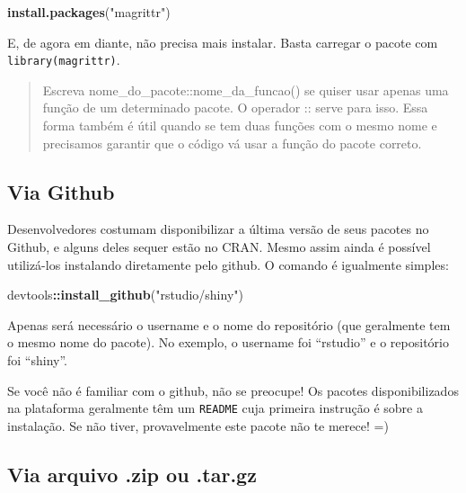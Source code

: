 \documentclass[
]{book}
\newenvironment{Shaded}{\begin{snugshade}}{\end{snugshade}}
\newcommand{\KeywordTok}[1]{\textcolor[rgb]{0.13,0.29,0.53}{\textbf{#1}}}
\newcommand{\NormalTok}[1]{#1}
\newcommand{\OperatorTok}[1]{\textcolor[rgb]{0.81,0.36,0.00}{\textbf{#1}}}
\newcommand{\StringTok}[1]{\textcolor[rgb]{0.31,0.60,0.02}{#1}}
\begin{document}
\begin{Shaded}
\begin{Highlighting}[]
\KeywordTok{install.packages}\NormalTok{(}\StringTok{"magrittr"}\NormalTok{)}
\end{Highlighting}
\end{Shaded}

E, de agora em diante, não precisa mais instalar. Basta carregar o pacote com \texttt{library(magrittr)}.

\begin{quote}
Escreva nome\_do\_pacote::nome\_da\_funcao() se quiser usar apenas uma função de um determinado pacote. O operador :: serve para isso. Essa forma também é útil quando se tem duas funções com o mesmo nome e precisamos garantir que o código vá usar a função do pacote correto.
\end{quote}

\hypertarget{via-github}{%
\subsection{Via Github}\label{via-github}}

Desenvolvedores costumam disponibilizar a última versão de seus pacotes no Github, e alguns deles sequer estão no CRAN. Mesmo assim ainda é possível utilizá-los instalando diretamente pelo github. O comando é igualmente simples:

\begin{Shaded}
\begin{Highlighting}[]
\NormalTok{devtools}\OperatorTok{::}\KeywordTok{install\_github}\NormalTok{(}\StringTok{"rstudio/shiny"}\NormalTok{)}
\end{Highlighting}
\end{Shaded}

Apenas será necessário o username e o nome do repositório (que geralmente tem o mesmo nome do pacote). No exemplo, o username foi ``rstudio'' e o repositório foi ``shiny''.

Se você não é familiar com o github, não se preocupe! Os pacotes disponibilizados na plataforma geralmente têm um \texttt{README} cuja primeira instrução é sobre a instalação. Se não tiver, provavelmente este pacote não te merece! =)

\hypertarget{via-arquivo-.zip-ou-.tar.gz}{%
\subsection{Via arquivo .zip ou .tar.gz}\label{via-arquivo-.zip-ou-.tar.gz}}
\end{document}
